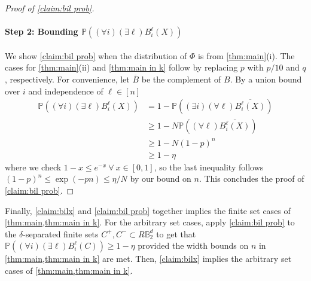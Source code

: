 \documentclass[aoap]{imsart}
\numberwithin{equation}{section}
\theoremstyle{definition}
\theoremstyle{remark}
\newcommand{\R}{\mathbb{R}} %
\numberwithin{equation}{section}
\newcommand{\0}{\mathbf{0}}
\newcommand{\1}{\mathbf{1}}
\renewcommand{\P}{\mathbb{P}}
\newcommand{\B}{\mathbb{B}}
\let \Re \relax
\DeclareMathOperator{\Re}{ReLU}
\numberwithin{equation}{section}
\begin{document}
\begin{proof}[Proof of \cref{claim:bil prob}]
\paragraph{Step 2: Bounding $\P\left((\forall i)(\exists \ell)B_{i}^{\ell}(X)\right)$}
We show \cref{claim:bil prob} when the distribution of $\Phi$ is from \cref{thm:main}(i). The cases for \cref{thm:main}(ii) and \cref{thm:main in k} follow by replacing $p$ with $p/10$ and $q$, respectively. For convenience, let $\overline{B}$ be the complement of $B$. By a union bound over $i$ and independence of $\ell\in [n]$
\begin{align*}
\P\left((\forall i)(\exists \ell)B_{i}^{\ell}(X)\right) & = 1-\P\left((\exists i)(\forall \ell)\overline{B_{i}^{\ell}(X)}\right)
\\ & \ge 1-N\P\left((\forall \ell)\overline{B_{i}^{\ell}(X)}\right)
\\ & \ge 1-N(1-p)^{n}
\\ & \ge 1-\eta
\end{align*}
where we check $1-x\leq e^{-x}\ \forall \ x\in [0, 1]$, so the last inequality follows $(1-p)^n\leq \exp(-pn)\leq \eta/N$ by our bound on $n$. This concludes the proof of \cref{claim:bil prob}.
\end{proof}
Finally, \cref{claim:bilx} and \cref{claim:bil prob} together implies the finite set cases of \cref{thm:main,thm:main in k}. For the arbitrary set cases, apply \cref{claim:bil prob} to the $\delta$-separated finite sets $C^+, C^-\subset R\B_2^d$ to get that $\P\left((\forall i)(\exists \ell)B_{i}^{\ell}(C)\right)\geq 1-\eta$ provided the width bounds on $n$ in \cref{thm:main,thm:main in k} are met. Then, \cref{claim:bilx} implies the arbitrary set cases of \cref{thm:main,thm:main in k}.
\end{document}
